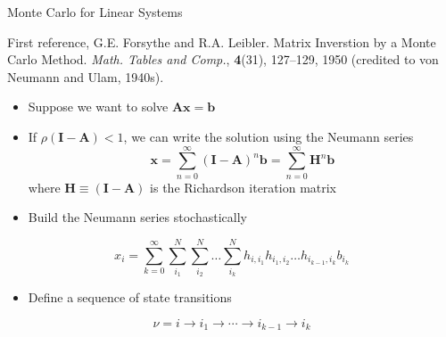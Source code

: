 \documentclass{beamer}
\begin{document}
\begin{frame}{Monte Carlo for Linear Systems}

  First reference, G.E. Forsythe and R.A. Leibler. Matrix Inverstion by a
  Monte Carlo Method. \textit{Math. Tables and Comp.}, {\bf 4}(31), 127--129,
  1950 (credited to von Neumann and Ulam, 1940s).
  \vfill
  \begin{itemize}
    \item Suppose we want to solve $\mathbf{Ax}=\mathbf{b}$
    \vfill
    \item If $\rho(\mathbf{I-A})<1$, we can write the solution using the
      Neumann series
      \begin{equation*}
        \mathbf{x} = \sum_{n=0}^{\infty} (\mathbf{I-A})^n \mathbf{b}
         = \sum_{n=0}^{\infty} \mathbf{H}^n \mathbf{b}
      \end{equation*}
      where $\mathbf{H} \equiv ( \mathbf{I-A} )$ is the Richardson
      iteration matrix
      \vfill
    \item Build the Neumann series stochastically
  \end{itemize}

  \[
  x_i = \sum_{k=0}^{\infty}\sum_{i_1}^{N}\sum_{i_2}^{N}\ldots
  \sum_{i_k}^{N}h_{i,i_1}h_{i_1,i_2}\ldots h_{i_{k-1},i_k}b_{i_k}
  \]

  \begin{itemize}
  \item Define a sequence of state transitions
  \end{itemize}
  \[
  \nu = i \rightarrow i_1 \rightarrow \cdots \rightarrow i_{k-1}
  \rightarrow i_{k}
  \]

\end{frame}

\end{document}
